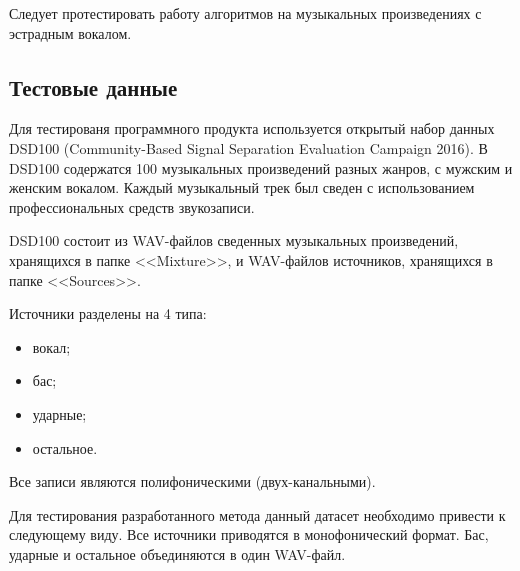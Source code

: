 Следует протестировать работу алгоритмов на музыкальных произведениях с эстрадным вокалом.

\subsection{Тестовые данные}

Для тестированя программного продукта используется открытый набор данных DSD100 (Community-Based Signal Separation Evaluation Campaign 2016). В DSD100 содержатся 100 музыкальных произведений разных жанров, с мужским и женским вокалом. Каждый музыкальный трек был сведен с использованием профессиональных средств звукозаписи.

DSD100 состоит из WAV-файлов сведенных музыкальных произведений, хранящихся в папке <<Mixture>>, и WAV-файлов источников, хранящихся в папке <<Sources>>.

Источники разделены на 4 типа:

\begin{itemize}
	\item вокал;
	\item бас;
	\item ударные;
	\item остальное.
\end{itemize}

Все записи являются полифоническими (двух-канальными).

Для тестирования разработанного метода данный датасет необходимо привести к следующему виду. Все источники приводятся в монофонический формат. Бас, ударные и остальное объединяются в один WAV-файл.

